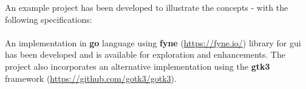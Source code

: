 \documentclass[a4paper,11pt]{article}
\theoremstyle{mytheor}
\begin{document}
An example project has been developed to illustrate the concepts - with the following specifications:
\paragraph{}

\paragraph{}

An implementation in \textbf{go} language using \textbf{fyne} (\url{https://fyne.io/}) library for gui has been developed and is available for exploration and enhancements. The project also incorporates an alternative implementation using the \textbf{gtk3} framework (\url{https://github.com/gotk3/gotk3}).

\end{document}

